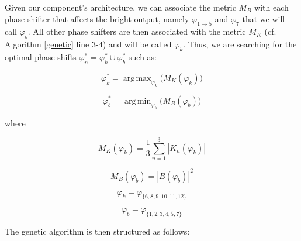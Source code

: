 \documentclass{aa}
\DeclareMathOperator*{\argmax}{arg\,max}
\DeclareMathOperator*{\argmin}{arg\,min}
\begin{document}
            Given our component's architecture, we can associate the metric $M_B$ with each phase shifter that affects the bright output, namely $\varphi_{1 \rightarrow 5}$ and $\varphi_7$ that we will call $\varphi_b$. All other phase shifters are then associated with the metric $M_K$ (cf. Algorithm \ref{genetic} line 3-4) and will be called $\varphi_k$. Thus, we are searching for the optimal phase shifts $\varphi_n^* = \varphi_k^* \cup \varphi_b^*$ such as:

            \begin{equation}
                \varphi_k^* = \argmax_{\varphi_k} \Big( M_K(\varphi_k) \Big)
            \end{equation}

            \begin{equation}
                \varphi_b^* = \argmin_{\varphi_b} \Big( M_B(\varphi_b) \Big)
            \end{equation}

            where
            
            \begin{equation}
                M_K(\varphi_k) = \frac{1}{3}\sum_{n=1}^3 |K_n(\varphi_k)|
            \end{equation}

            \begin{equation}
                M_B(\varphi_b) = |B(\varphi_b)|^2
            \end{equation}

            \begin{equation}
                \varphi_k = \varphi_{\{6,8,9,10,11,12\}}
            \end{equation}

            \begin{equation}
                \varphi_b = \varphi_{\{1,2,3,4,5,7\}}
            \end{equation}

            The genetic algorithm is then structured as follows:
\end{document}
